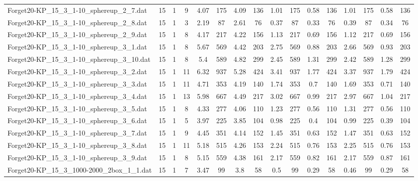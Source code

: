 \begin{sidewaystable}[!ht]
{\begin{tabular}{lccccccccccccccc}
Forget20-KP\_15\_3\_1-10\_sphereup\_2\_7.dat & 15 & 1 & 9 & 4.07 & 175 & 4.09 & 136 & 1.01 & 175 &  \textcolor{blue2}{0.58} & 136 & 1.01 & 175 &  \textcolor{blue2}{0.58} & 136 \\
Forget20-KP\_15\_3\_1-10\_sphereup\_2\_8.dat & 15 & 1 & 3 & 2.19 & 87 & 2.61 & 76 & 0.37 & 87 & 0.33 & 76 & 0.39 & 87 & 0.34 & 76 \\
Forget20-KP\_15\_3\_1-10\_sphereup\_2\_9.dat & 15 & 1 & 8 & 4.17 & 217 & 4.22 & 156 & 1.13 & 217 &  \textcolor{blue2}{0.69} & 156 & 1.12 & 217 &  \textcolor{blue2}{0.69} & 156 \\
Forget20-KP\_15\_3\_1-10\_sphereup\_3\_1.dat & 15 & 1 & 8 & 5.67 & 569 & 4.42 & 203 & 2.75 & 569 &  \textcolor{blue2}{0.88} & 203 & 2.66 & 569 & 0.93 & 203 \\
Forget20-KP\_15\_3\_1-10\_sphereup\_3\_10.dat & 15 & 1 & 8 & 5.4 & 589 & 4.82 & 299 & 2.45 & 589 & 1.31 & 299 & 2.42 & 589 & 1.28 & 299 \\
Forget20-KP\_15\_3\_1-10\_sphereup\_3\_2.dat & 15 & 1 & 11 & 6.32 & 937 & 5.28 & 424 & 3.41 & 937 & 1.77 & 424 & 3.37 & 937 & 1.79 & 424 \\
Forget20-KP\_15\_3\_1-10\_sphereup\_3\_3.dat & 15 & 1 & 11 & 4.71 & 353 & 4.19 & 140 & 1.74 & 353 &  \textcolor{blue2}{0.7} & 140 & 1.69 & 353 & 0.71 & 140 \\
Forget20-KP\_15\_3\_1-10\_sphereup\_3\_4.dat & 15 & 1 & 13 & 5.98 & 667 & 4.49 & 217 & 3.02 & 667 &  \textcolor{blue2}{0.99} & 217 & 2.97 & 667 & 1.04 & 217 \\
Forget20-KP\_15\_3\_1-10\_sphereup\_3\_5.dat & 15 & 1 & 8 & 4.33 & 277 & 4.06 & 110 & 1.23 & 277 & 0.56 & 110 & 1.31 & 277 & 0.56 & 110 \\
Forget20-KP\_15\_3\_1-10\_sphereup\_3\_6.dat & 15 & 1 & 5 & 3.97 & 225 & 3.85 & 104 & 0.98 & 225 & 0.4 & 104 & 0.99 & 225 & 0.39 & 104 \\
Forget20-KP\_15\_3\_1-10\_sphereup\_3\_7.dat & 15 & 1 & 9 & 4.45 & 351 & 4.14 & 152 & 1.45 & 351 &  \textcolor{blue2}{0.63} & 152 & 1.47 & 351 &  \textcolor{blue2}{0.63} & 152 \\
Forget20-KP\_15\_3\_1-10\_sphereup\_3\_8.dat & 15 & 1 & 11 & 5.18 & 515 & 4.26 & 153 & 2.24 & 515 &  \textcolor{blue2}{0.76} & 153 & 2.25 & 515 &  \textcolor{blue2}{0.76} & 153 \\
Forget20-KP\_15\_3\_1-10\_sphereup\_3\_9.dat & 15 & 1 & 8 & 5.15 & 559 & 4.38 & 161 & 2.17 & 559 &  \textcolor{blue2}{0.82} & 161 & 2.17 & 559 & 0.87 & 161 \\
Forget20-KP\_15\_3\_1000-2000\_2box\_1\_1.dat & 15 & 1 & 7 & 3.47 & 99 & 3.8 & 58 & 0.5 & 99 &  \textcolor{blue2}{0.29} & 58 & 0.46 & 99 &  \textcolor{blue2}{0.29} & 58 \\

\end{tabular}}
\end{sidewaystable}
